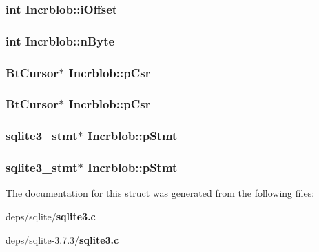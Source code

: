 \subsubsection{\setlength{\rightskip}{0pt plus 5cm}int \bf{Incrblob::i\-Offset}}\label{structIncrblob_afbdb0e7f4fa82d4bdfb9680f1ab90e0}


\subsubsection{\setlength{\rightskip}{0pt plus 5cm}int \bf{Incrblob::n\-Byte}}\label{structIncrblob_c9191c5a92ed78dd176d0187a1068102}


\subsubsection{\setlength{\rightskip}{0pt plus 5cm}\bf{Bt\-Cursor}$\ast$ \bf{Incrblob::p\-Csr}}\label{structIncrblob_f4dd81c9cf21158a8aba933f4d9e0d39}


\subsubsection{\setlength{\rightskip}{0pt plus 5cm}\bf{Bt\-Cursor}$\ast$ \bf{Incrblob::p\-Csr}}\label{structIncrblob_f4dd81c9cf21158a8aba933f4d9e0d39}


\subsubsection{\setlength{\rightskip}{0pt plus 5cm}\bf{sqlite3\_\-stmt}$\ast$ \bf{Incrblob::p\-Stmt}}\label{structIncrblob_29dafb3cba31232c4b912ea9d309e980}


\subsubsection{\setlength{\rightskip}{0pt plus 5cm}\bf{sqlite3\_\-stmt}$\ast$ \bf{Incrblob::p\-Stmt}}\label{structIncrblob_29dafb3cba31232c4b912ea9d309e980}




The documentation for this struct was generated from the following files:\begin{CompactItemize}
\item 
deps/sqlite/\bf{sqlite3.c}\item 
deps/sqlite-3.7.3/\bf{sqlite3.c}\end{CompactItemize}
